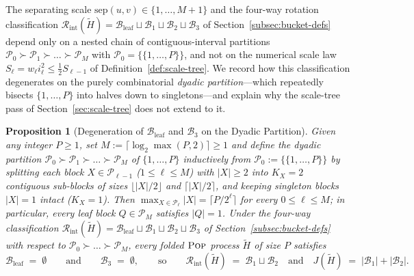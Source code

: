 \documentclass[11pt]{article}
\newtheorem{proposition}[theorem]{Proposition}
\theoremstyle{definition}
\theoremstyle{remark}
\newcommand{\sep}{\mathrm{sep}}
\newcommand{\POP}{\textnormal{\scshape Pop}}
\begin{document}
The separating scale $\sep(u, v) \in \{1, \dots, M + 1\}$ and the four-way rotation classification $\mathcal{R}_{\mathrm{int}}(\widetilde{H}) = \mathcal{B}_{\mathrm{leaf}} \sqcup \mathcal{B}_1 \sqcup \mathcal{B}_2 \sqcup \mathcal{B}_3$ of Section~\ref{subsec:bucket-defs} depend only on a nested chain of contiguous-interval partitions $\mathcal{P}_0 \succ \mathcal{P}_1 \succ \dots \succ \mathcal{P}_M$ with $\mathcal{P}_0 = \{\{1, \dots, P\}\}$, and not on the numerical scale law $S_\ell = w_\ell i_\ell^2 \le \frac{1}{2} S_{\ell-1}$ of Definition~\ref{def:scale-tree}. We record how this classification degenerates on the purely combinatorial \emph{dyadic partition}---which repeatedly bisects $\{1, \dots, P\}$ into halves down to singletons---and explain why the scale-tree pass of Section~\ref{sec:scale-tree} does not extend to it.

\begin{proposition}[Degeneration of $\mathcal{B}_{\mathrm{leaf}}$ and $\mathcal{B}_3$ on the Dyadic Partition]
\label{prop:dyadic-collapse}
Given any integer $P \ge 1$, set $M := \lceil \log_2 \max(P, 2) \rceil \ge 1$ and define the \emph{dyadic partition} $\mathcal{P}_0 \succ \mathcal{P}_1 \succ \dots \succ \mathcal{P}_M$ of $\{1, \dots, P\}$ inductively from $\mathcal{P}_0 := \{\{1, \dots, P\}\}$ by splitting each block $X \in \mathcal{P}_{\ell-1}$ ($1 \le \ell \le M$) with $|X| \ge 2$ into $K_X = 2$ contiguous sub-blocks of sizes $\lfloor |X| / 2 \rfloor$ and $\lceil |X| / 2 \rceil$, and keeping singleton blocks $|X| = 1$ intact ($K_X = 1$). Then $\max_{X \in \mathcal{P}_\ell} |X| = \lceil P / 2^\ell \rceil$ for every $0 \le \ell \le M$; in particular, every leaf block $Q \in \mathcal{P}_M$ satisfies $|Q| = 1$. Under the four-way classification $\mathcal{R}_{\mathrm{int}}(\widetilde{H}) = \mathcal{B}_{\mathrm{leaf}} \sqcup \mathcal{B}_1 \sqcup \mathcal{B}_2 \sqcup \mathcal{B}_3$ of Section~\ref{subsec:bucket-defs} with respect to $\mathcal{P}_0 \succ \dots \succ \mathcal{P}_M$, every folded $\POP$ process $\widetilde{H}$ of size $P$ satisfies
\[
\mathcal{B}_{\mathrm{leaf}} \;=\; \emptyset \qquad\text{and}\qquad \mathcal{B}_3 \;=\; \emptyset,
\qquad\text{so}\qquad
\mathcal{R}_{\mathrm{int}}(\widetilde{H}) \;=\; \mathcal{B}_1 \sqcup \mathcal{B}_2
\quad\text{and}\quad
J(\widetilde{H}) \;=\; |\mathcal{B}_1| + |\mathcal{B}_2|.
\]
\end{proposition}
\end{document}
